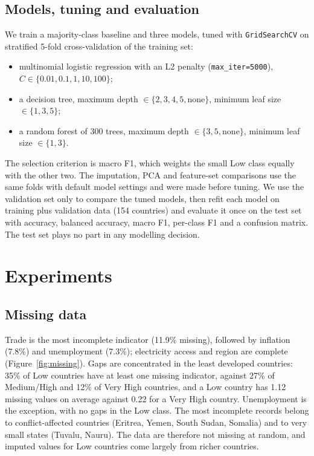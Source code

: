 \documentclass[10pt,a4paper]{article}
\newcommand{\code}[1]{\texttt{\small #1}}
\begin{document}
\subsection{Models, tuning and evaluation}
We train a majority-class baseline and three models, tuned with \code{GridSearchCV} on stratified 5-fold
cross-validation of the training set:
\begin{itemize}
\item multinomial logistic regression with an L2 penalty (\code{max\_iter=5000}), $C \in \{0.01, 0.1, 1, 10, 100\}$;
\item a decision tree, maximum depth $\in \{2, 3, 4, 5, \text{none}\}$, minimum leaf size $\in \{1, 3, 5\}$;
\item a random forest of 300 trees, maximum depth $\in \{3, 5, \text{none}\}$, minimum leaf size $\in \{1, 3\}$.
\end{itemize}
The selection criterion is macro F1, which weights the small Low class equally with the other two. The imputation,
PCA and feature-set comparisons use the same folds with default model settings and were made before tuning. We use
the validation set only to compare the tuned models, then refit each model on training plus validation data (154
countries) and evaluate it once on the test set with accuracy, balanced accuracy, macro F1, per-class F1 and a
confusion matrix. The test set plays no part in any modelling decision.

\section{Experiments}
\subsection{Missing data}
Trade is the most incomplete indicator (11.9\% missing), followed by inflation (7.8\%) and unemployment (7.3\%);
electricity access and region are complete (Figure~\ref{fig:missing}). Gaps are concentrated in the least developed
countries: 35\% of Low countries have at least one missing indicator, against 27\% of Medium/High and 12\% of
Very High countries, and a Low country has 1.12 missing values on average against 0.22 for a Very High country.
Unemployment is the exception, with no gaps in the Low class. The most incomplete records belong to
conflict-affected countries (Eritrea, Yemen, South Sudan, Somalia) and to very small states (Tuvalu, Nauru). The
data are therefore not missing at random, and imputed values for Low countries come largely from richer countries.
\end{document}
